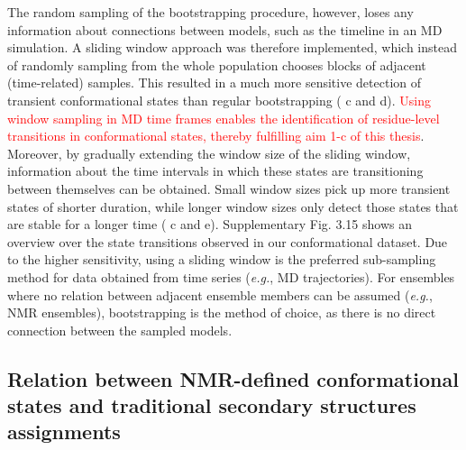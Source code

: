 The random sampling of the bootstrapping procedure, however, loses any information about connections between models, such as the timeline in an MD simulation. A sliding window approach was therefore implemented, which instead of randomly sampling from the whole population chooses blocks of adjacent (time-related) samples. This resulted in a much more sensitive detection of transient conformational states than regular bootstrapping ( c and d). \textcolor{red}{Using window sampling in MD time frames enables the identification of residue-level transitions in conformational states, thereby fulfilling aim 1-c of this thesis}. Moreover, by gradually extending the window size of the sliding window, information about the time intervals in which these states are transitioning between themselves can be obtained. Small window sizes pick up more transient states of shorter duration, while longer window sizes only detect those states that are stable for a longer time ( c and e). 
Supplementary Fig. 3.15 shows an overview over the state transitions observed in our conformational dataset. Due to the higher sensitivity, using a sliding window is the preferred sub-sampling method for data obtained from time series (\textit{e.g.}, MD trajectories). For ensembles where no relation between adjacent ensemble members can be assumed (\textit{e.g.}, NMR ensembles), bootstrapping is the method of choice, as there is no direct connection between the sampled models.

\subsection{Relation between NMR-defined conformational states and traditional secondary structures assignments} 
\label{section:DSSP_vs_constava}


